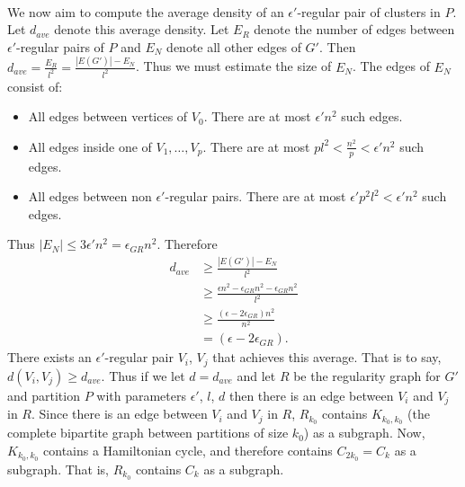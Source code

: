 \documentclass[letterpaper,12pt,oneside,onecolumn]{article}
\begin{document}
\paragraph{}
We now aim to compute the average density of an $\epsilon'$-regular pair of clusters in $P$. Let $d_{ave}$ denote this average density. Let $E_R$ denote the number of edges between $\epsilon'$-regular pairs of $P$ and $E_N$ denote all other edges of $G'$. Then $d_{ave} = \frac{E_R}{l^2} = \frac{|E(G')| - E_N}{l^2}$. Thus we must estimate the size of $E_N$. The edges of $E_N$ consist of:
\begin{itemize}
\item All edges between vertices of $V_0$. There are at most $\epsilon'n^2$ such edges.\\
\item All edges inside one of $V_1, \dots, V_p$. There are at most $pl^2 < \frac{n^2}{p} < \epsilon'n^2$ such edges.\\
\item All edges between non $\epsilon'$-regular pairs. There are at most $\epsilon'p^2l^2 < \epsilon' n^2$ such edges. \\
\end{itemize}
Thus $|E_N| \leq 3\epsilon'n^2 = \epsilon_{GR}n^2$. Therefore \begin{align*}d_{ave} &\geq \frac{|E(G')| - E_N}{l^2} \\&\geq \frac{\epsilon n^2 -\epsilon_{GR}n^2- \epsilon_{GR}n^2}{l^2} \\&\geq \frac{(\epsilon - 2\epsilon_{GR})n^2}{n^2} \\&= (\epsilon - 2\epsilon_{GR}).\end{align*}
There exists an $\epsilon'$-regular pair $V_i$, $V_j$ that achieves this average. That is to say, $d(V_i,V_j) \geq d_{ave}$. Thus if we let $d = d_{ave}$ and let $R$ be the regularity graph for $G'$ and partition $P$ with parameters $\epsilon'$, $l$, $d$ then there is an edge between $V_i$ and $V_j$ in $R$. Since there is an edge between $V_i$ and $V_j$ in $R$, $R_{k_0}$ contains $K_{k_0,k_0}$ (the complete bipartite graph between partitions of size $k_0$) as a subgraph. Now, $K_{k_0,k_0}$ contains a Hamiltonian cycle, and therefore contains $C_{2k_0} = C_{k}$ as a subgraph. That is, $R_{k_0}$ contains $C_k$ as a subgraph.
\end{document}
